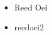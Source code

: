 \documentclass[10pt]{article}
\begin{document}
\begin{itemize}
    \item[] Reed Oei
    \item[] reedoei2
\end{itemize}
\end{document}
